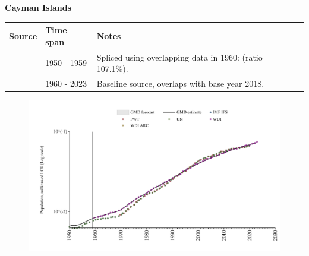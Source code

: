 \documentclass[12pt,a4paper,landscape]{article}
\begin{document}
\begin{adjustbox}{max totalsize={\paperwidth}{\paperheight},center}
\begin{minipage}[t][\textheight][t]{\textwidth}
\vspace*{0.5cm}
{}
\begin{center}
{\Large\bfseries Cayman Islands}
\end{center}
\vspace{0.5cm}
\begin{table}[H]
\centering
\small
\begin{tabular}{|l|l|l|}
\hline
\textbf{Source} & \textbf{Time span} & \textbf{Notes} \\
\hline
\rowcolor{white}\cite{IMF_IFS}& 1950 - 1959 &Spliced using overlapping data in 1960: (ratio = 107.1\%).\\
\rowcolor{lightgray}\cite{WDI}& 1960 - 2023 &Baseline source, overlaps with base year 2018.\\
\hline
\end{tabular}
\end{table}
\begin{figure}[H]
\centering
\includegraphics[width=\textwidth,height=0.6\textheight,keepaspectratio]{graphs/CYM_pop.pdf}
\end{figure}
\end{minipage}
\end{adjustbox}
\end{document}
